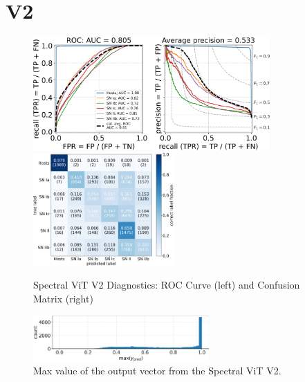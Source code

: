\clearpage
\section{V2}

\begin{figure}
    \centering
    \includegraphics[height=4.3cm]{figures/v2_real/vit_model_V2rocfulle_e26.png}
    \quad
    \includegraphics[height=4.3cm]{figures/v2_real/vit_model_V2cmfull_e26.png}
    \caption{Spectral ViT V2 Diagnostics: ROC Curve (left) and Confusion Matrix (right)\label{fig:v2_qual}}
\end{figure}

\begin{figure}
    \centering
    \includegraphics[width=0.6\textwidth]{figures/v2_real/vit_model_V2max_ypred_26.png}
    \caption{Max value of the output vector from the Spectral ViT V2.\label{fig:v2_max}}
\end{figure}

